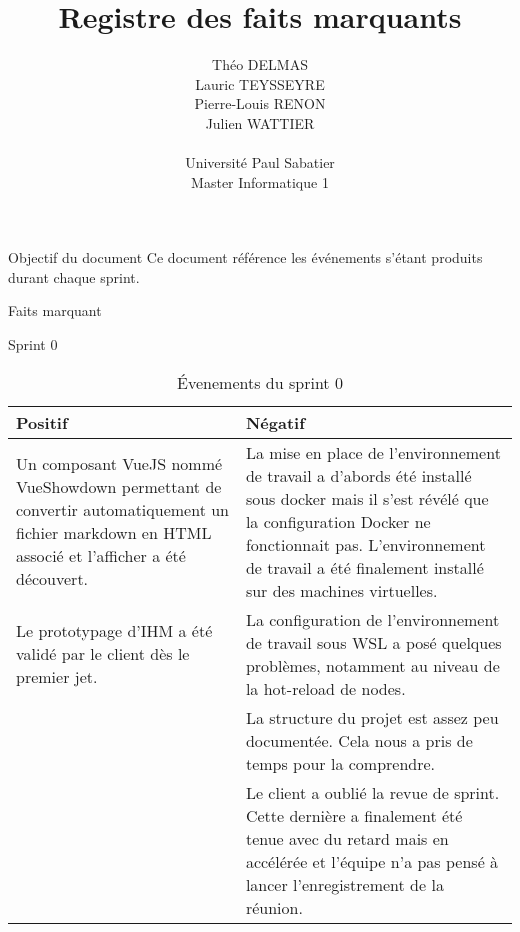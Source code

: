 \documentclass[]{article}
\title{Registre des faits marquants}
\author{
    Théo DELMAS\\
    Lauric TEYSSEYRE\\
    Pierre-Louis RENON\\
    Julien WATTIER\\
    \\
    Université Paul Sabatier\\
    Master Informatique 1\\
   }
\begin{document}
\maketitle
\newpage
\tableofcontents
\newpage

\begin{section}{Objectif du document}
 Ce document référence les événements s'étant produits durant chaque sprint.
\end{section}

{
\setlength{\parindent}{0pt} %
\begin{section}{Faits marquant}
    \begin{subsection}{Sprint 0}
        \begin{table}[H]
            \caption{Évenements du sprint 0}
            \begin{tabularx}{\columnwidth}{|X|X|}
                \hline
                \cellcolor[HTML]{17FF00}Positif & \cellcolor[HTML]{FF2D00}Négatif\\
                \hline
                Un composant VueJS nommé VueShowdown permettant de convertir automatiquement un fichier markdown en HTML associé et l'afficher a été découvert.& La mise en place de l'environnement de travail a d'abords été installé sous docker mais il s'est révélé que la configuration Docker ne fonctionnait pas. L'environnement de travail a été finalement installé sur des machines virtuelles.\\
                \hline
                Le prototypage d'IHM a été validé par le client dès le premier jet. & La configuration de l'environnement de travail sous WSL a posé quelques problèmes, notamment au niveau de la hot-reload de nodes.\\
                \hline
                & La structure du projet est assez peu documentée. Cela nous a pris de temps pour la comprendre.\\
                \hline
                & Le client a oublié la revue de sprint. Cette dernière a finalement été tenue avec du retard mais en accélérée et l'équipe n'a pas pensé à lancer l'enregistrement de la réunion.\\
                \hline
            \end{tabularx}
        \end{table}
    \end{subsection}


\end{section}}
\end{document}
